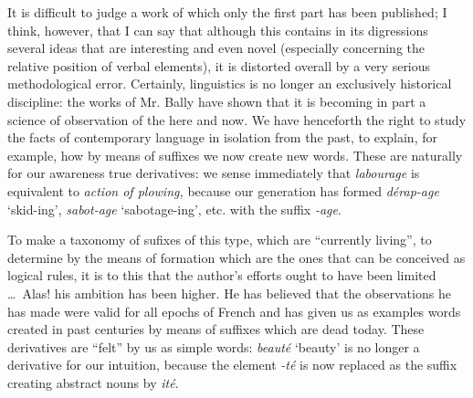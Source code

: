 \begin{appendices}
{  It is difficult to judge a work of which only the first part has
  been published; I think, however, that I can say that although this
  contains in its digressions several ideas that are interesting and
  even novel (especially concerning the relative position of verbal
  elements), it is distorted overall by a very serious methodological
  error. Certainly, linguistics is no longer an exclusively historical
  discipline: the works of Mr. Bally have shown that it is becoming in
  part a science of observation of the here and now.  We have
  henceforth the right to study the facts of contemporary language in
  isolation from the past, to explain, for example, how by means of
  suffixes we now create new words.  These are naturally for our
  awareness true derivatives: we sense immediately that
  \emph{labourage} is equivalent to \emph{action of plowing,} because
  our generation has formed \emph{dérap-age} `skid-ing',
  \emph{sabot-age} `sabotage-ing', etc. with the suffix \emph{-age}.

  To make a taxonomy of sufixes of this type, which are ``currently
  living'', to determine by the means of formation which are the ones
  that can be conceived as logical rules, it is to this that the
  author's efforts ought to have been limited \ldots\ Alas! his
  ambition has been higher. He has believed that the observations he
  has made were valid for all epochs of French and has given us as
  examples words created in past centuries by means of suffixes which
  are dead today. These derivatives are ``felt'' by us as simple
  words: \emph{beauté} `beauty' is no longer a derivative for our
  intuition, because the element \emph{-té} is now replaced as the
  suffix creating abstract nouns by \emph{ité}. 


}

\end{appendices}
